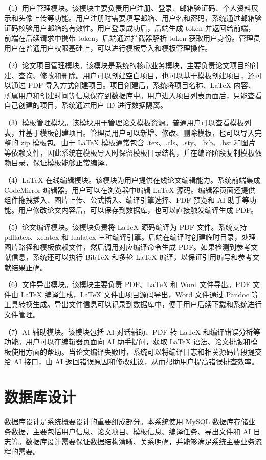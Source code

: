 \documentclass[twoside,openright]{xduugthesis}
\begin{document}
（1）用户管理模块。该模块主要负责用户注册、登录、邮箱验证码、个人资料展示和头像上传等功能。用户注册时需要填写邮箱、用户名和密码，系统通过邮箱验证码校验用户邮箱的有效性。用户登录成功后，后端生成 token 并返回给前端，前端在后续请求中携带 token，后端通过拦截器解析 token 获取用户身份。管理员用户在普通用户权限基础上，可以进行模板导入和模板管理操作。

（2）论文项目管理模块。该模块是系统的核心业务模块，主要负责论文项目的创建、查询、修改和删除。用户可以创建空白项目，也可以基于模板创建项目，还可以通过 PDF 导入方式创建项目。项目创建后，系统将项目名称、LaTeX 内容、所属用户和创建时间等信息保存到数据库中。用户进入项目列表页面后，只能查看自己创建的项目，系统通过用户 ID 进行数据隔离。

（3）模板管理模块。该模块用于管理论文模板资源。普通用户可以查看模板列表，并基于模板创建项目。管理员用户可以新增、修改、删除模板，也可以导入完整的 zip 模板包。由于 LaTeX 模板通常包含 .tex、.cls、.sty、.bib、.bst 和图片等依赖文件，因此系统在模板导入时保留模板目录结构，并在编译阶段复制模板依赖目录，保证模板能够正常编译。

（4）LaTeX 在线编辑模块。该模块为用户提供在线论文编辑能力。系统前端集成 CodeMirror 编辑器，用户可以在浏览器中编辑 LaTeX 源码。编辑器页面还提供组件拖拽插入、图片上传、公式插入、编译引擎选择、PDF 预览和 AI 助手等功能。用户修改论文内容后，可以保存到数据库，也可以直接触发编译生成 PDF。

（5）论文编译模块。该模块负责将 LaTeX 源码编译为 PDF 文件。系统支持 pdflatex、xelatex 和 lualatex 三种编译引擎。后端在编译时创建临时目录，处理图片路径和模板依赖文件，然后调用对应编译命令生成 PDF。如果检测到参考文献信息，系统还可以执行 BibTeX 和多轮 LaTeX 编译，以保证引用编号和参考文献结果正确。

（6）文件导出模块。该模块主要负责 PDF、LaTeX 和 Word 文件导出。PDF 文件由 LaTeX 编译生成，LaTeX 文件由项目源码导出，Word 文件通过 Pandoc 等工具转换生成。导出文件信息可以记录到数据库中，便于用户后续下载和系统进行文件管理。

（7）AI 辅助模块。该模块包括 AI 对话辅助、PDF 转 LaTeX 和编译错误分析等功能。用户可以在编辑器页面向 AI 助手提问，获取 LaTeX 语法、论文排版和模板使用方面的帮助。当论文编译失败时，系统可以将编译日志和相关源码片段提交给 AI 接口，由 AI 返回错误原因和修改建议，从而帮助用户提高错误排查效率。

\section{数据库设计}
数据库设计是系统概要设计的重要组成部分。本系统使用 MySQL 数据库存储业务数据，主要包括用户信息、论文项目、模板信息、编译任务、导出文件和 AI 日志等。数据库设计需要保证数据结构清晰、关系明确，并能够满足系统主要业务流程的需要。
\end{document}
